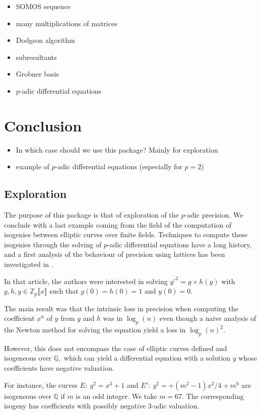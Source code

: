 \documentclass[sigconf]{acmart}
\theoremstyle{definition}
\begin{document}
\begin{itemize}
\item SOMOS sequence
\item many multiplications of matrices
\item Dodgson algorithm
\item subresultants
\item Grobner basis
\item $p$-adic differential equations
\end{itemize}

\section{Conclusion}

\begin{itemize}
\item In which case should we use this package? Mainly for exploration
\item example of $p$-adic differential equations (especially for $p=2$)
\end{itemize}

\subsection{Exploration}

The purpose of this package is that of exploration
of the $p$-adic precision.
We conclude with a last example coming
from the field of the computation of
isogenies between elliptic curves over finite fields.
Techniques to compute these isogenies
through the solving of $p$-adic differential equations
have a long history, and a first
analysis of the behaviour of precision using
lattices has been investigated in \cite{LV16}.

In that article, the authors were interested in
solving $y'^2=g \times h(y)$ with
$g,h,y \in \mathbb{Z}_p \llbracket x \rrbracket$
such that $g(0)=h(0)=1$ and $y(0)=0.$

The main result was that the intrinsic loss in precision
when computing the coefficient $x^n$ of $y$
from $g$ and $h$ was in $\log_p(n)$
even though a naive analysis of
the Newton method for solving the equation
yield a loss in $\log_p(n)^2.$

However, this does not encompass the case of 
elliptic curves defined and isogeneous 
over $\mathbb{Q},$ which can yield a differential 
equation with a solution $y$ whose coefficients
have negative valuation.

For instance, the curves 
$E: \: y^2=x^3+1$
and $E': \: y^2=+ (m^2-1)x^2/4 + m^6$ are isogeneous
over $\mathbb{Q}$ if  $m$ is an odd integer.
We take $m=67.$ The corresponding isogeny has coefficients with possibly
negative $3$-adic valuation.
\end{document}
